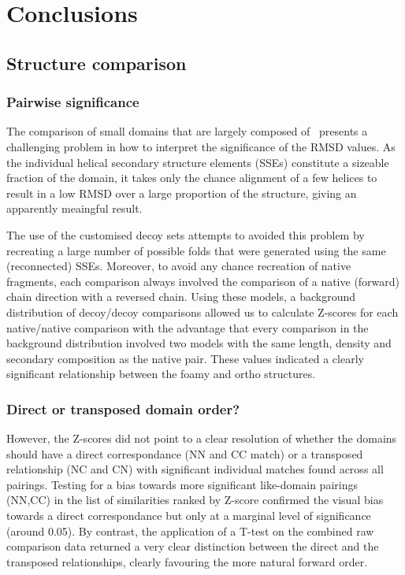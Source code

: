 \section{Conclusions}

\subsection{Structure comparison}

\subsubsection{Pairwise significance}

The comparison of small domains that are largely composed of \AHs\ presents a challenging problem in how
to interpret the significance of the RMSD values.  As the individual helical secondary structure elements
(SSEs) constitute a sizeable fraction of the domain, it takes only the chance alignment of a few helices
to result in a low RMSD over a large proportion of the structure, giving an apparently meaingful result.  

The use of
the customised decoy sets attempts to avoided this problem by recreating a large number of possible folds
that were generated using the same (reconnected) SSEs.   Moreover, to avoid any chance recreation of native fragments,
each comparison always involved the comparison of a native (forward) chain direction with a reversed chain.
Using these models, a background distribution of decoy/decoy comparisons allowed us to calculate Z-scores
for each native/native comparison with the advantage that every comparison in the background distribution
involved two models with the same length, density and secondary composition as the native pair.
These values indicated a clearly significant relationship between the foamy and ortho structures.   

\subsubsection{Direct or transposed domain order?}

However, the Z-scores did not point to a clear resolution of whether the domains should have a direct
correspondance (NN and CC match) or a transposed relationship (NC and CN) with significant individual
matches found across all pairings.  Testing for a bias towards more significant like-domain pairings (NN,CC)
in the list of similarities ranked by Z-score confirmed the visual bias towards a direct correspondance
but only at a marginal level of significance (around 0.05).  By contrast, the application of a T-test on the
combined raw comparison data returned a very clear distinction between the direct and the transposed
relationships, clearly favouring the more natural forward order.  

